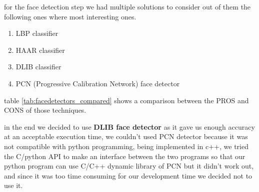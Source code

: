 for the face detection step we had multiple solutions to consider out of them the following ones where most interesting ones.
\begin{enumerate}
	\item LBP classifier
	\item HAAR classifier
	\item DLIB classifier
	\item PCN (Progressive Calibration Network) face detector
\end{enumerate}
table \ref{tab:facedetectors_compared} shows a comparison between the PROS and CONS of those techniques.\newline

in the end we decided to use \textbf{DLIB face detector} as it gave us enough accuracy at an acceptable execution time, 
we couldn't used PCN detector because it was not compatible with python programming, being implemented in c++, we tried the C/python API to make an interface between the two programs so that our python program can use C/C++ dynamic library of PCN but it didn't work out, and since it was too time consuming for our development time we decided not to use it.

